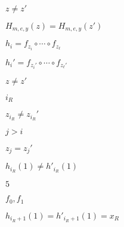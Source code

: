 \documentclass[10pt]{book}
\begin{document}
\begin{mdSnippets}
\begin{mdInlineSnippet}[66f6ed553b3c90faa9db8076b6031404]
$z \neq z'$\end{mdInlineSnippet}%
\begin{mdInlineSnippet}[0ef22b749b4458a1f3b050569661a956]%
$H_{m,e,y}(z) = H_{m,e,y}(z')$\end{mdInlineSnippet}%
\begin{mdInlineSnippet}[9e89ccda5f22517eb5bf97aa64ec094b]%
$h_i = f_{z_{i}} \circ \cdots \circ f_{z_{\ell}}$\end{mdInlineSnippet}%
\begin{mdInlineSnippet}%
$h_i' = f_{z_{i}'} \circ \cdots \circ f_{z_{\ell}'}$\end{mdInlineSnippet}%
\begin{mdInlineSnippet}[66f6ed553b3c90faa9db8076b6031404]%
$z \neq z'$\end{mdInlineSnippet}%
\begin{mdInlineSnippet}[74c419a8854d57235aa45e271189c64d]%
$i_R$\end{mdInlineSnippet}%
\begin{mdInlineSnippet}[acc1ff737c3921654dd302db00b1c54d]%
$z_{i_R} \neq z_{i_R}'$\end{mdInlineSnippet}%
\begin{mdInlineSnippet}[2e35db3fefbe167f6a25e745ab7755c1]%
$j > i$\end{mdInlineSnippet}%
\begin{mdInlineSnippet}%
$z_j = z_j'$\end{mdInlineSnippet}%
\begin{mdInlineSnippet}%
$h_{i_R}(1) \neq h'_{i_R}(1)$\end{mdInlineSnippet}%
\begin{mdInlineSnippet}[e4da3b7fbbce2345d7772b0674a318d5]%
$5$\end{mdInlineSnippet}%
\begin{mdInlineSnippet}[48fe47f7ed3a51ec2d3a3549966737d8]%
$f_0,f_1$\end{mdInlineSnippet}%
\begin{mdInlineSnippet}%
$h_{i_R+1}(1) = h'_{i_R+1}(1) = x_R$\end{mdInlineSnippet}%

\end{mdSnippets}
\end{document}

